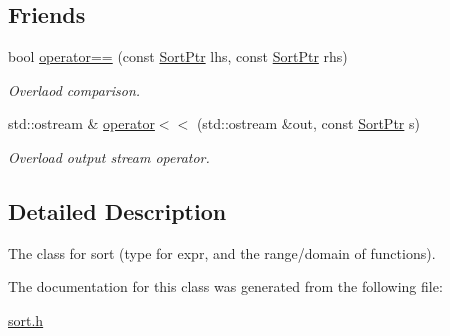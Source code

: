 \subsection*{Friends}
\begin{DoxyCompactItemize}
\item 
\mbox{\label{classilang_1_1_sort_a3dca84cb983c2dea4b9dc3685701c498}} 
bool \mbox{\hyperlink{classilang_1_1_sort_a3dca84cb983c2dea4b9dc3685701c498}{operator==}} (const \mbox{\hyperlink{classilang_1_1_sort_a8b9cc5e381404211a1c0423327866d3b}{Sort\+Ptr}} lhs, const \mbox{\hyperlink{classilang_1_1_sort_a8b9cc5e381404211a1c0423327866d3b}{Sort\+Ptr}} rhs)
\begin{DoxyCompactList}\small\item\em Overlaod comparison. \end{DoxyCompactList}\item 
\mbox{\label{classilang_1_1_sort_a483a669ce1bb7709417f405090b068bf}} 
std\+::ostream \& \mbox{\hyperlink{classilang_1_1_sort_a483a669ce1bb7709417f405090b068bf}{operator$<$$<$}} (std\+::ostream \&out, const \mbox{\hyperlink{classilang_1_1_sort_a8b9cc5e381404211a1c0423327866d3b}{Sort\+Ptr}} s)
\begin{DoxyCompactList}\small\item\em Overload output stream operator. \end{DoxyCompactList}\end{DoxyCompactItemize}


\subsection{Detailed Description}
The class for sort (type for expr, and the range/domain of functions). 

The documentation for this class was generated from the following file\+:\begin{DoxyCompactItemize}
\item 
\mbox{\hyperlink{sort_8h}{sort.\+h}}\end{DoxyCompactItemize}
